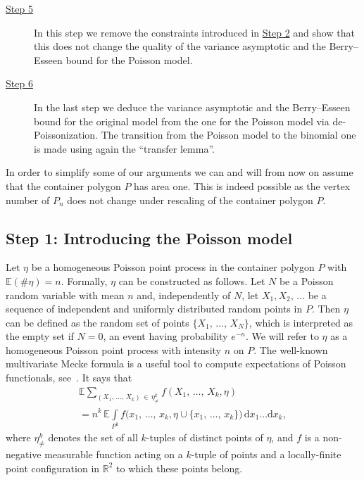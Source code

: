 \documentclass[AHL,Unicode,longabstracts,published]{cedram}
\newcommand{\bbR}{\mathbb{R}}
\newcommand{\bbE}{\mathbb{E}}
\begin{document}
\begin{description}
\item[{\hyperref[step5]{Step 5}}] In this step we remove the constraints introduced in \hyperref[step2]{Step 2} and show that this does not change the quality of the variance asymptotic and the Berry--Esseen bound for the Poisson model.

\item[{\hyperref[sec:dePoisson]{Step 6}}] In the last step we deduce the variance asymptotic and the Berry--Esseen bound for the original model from the one for the Poisson model via de-Poissonization. The transition from the Poisson model to the binomial one is made using again the ``transfer lemma''.
\end{description}

In order to simplify some of our arguments we can and will from now on assume that the container polygon $P$ has area one. This is indeed possible as the vertex number of $P_n$ does not change under rescaling of the container polygon $P$.


\subsection{Step 1: Introducing the Poisson model} \label{subsec1}

Let $\eta$ be a homogeneous Poisson point process in the container polygon $P$ with $\bbE(\#\eta) = n$. Formally, $\eta$ can be constructed as follows. Let $N$ be a Poisson random variable with mean $n$ and, independently of $N$, let $X_1,X_2,\,\ldots$ be a sequence of independent and uniformly distributed random points in $P$. Then $\eta$ can be defined as the random set of points $\{X_1,\,\ldots,\,X_N\}$, which is interpreted as the empty set if $N=0$, an event having probability $e^{-n}$. We will refer to $\eta$ as a homogeneous Poisson point process with intensity $n$ on $P$. The well-known multivariate Mecke formula is a useful tool to compute expectations of Poisson functionals, see~\cite[Theorem~4.1]{LP}. It says that
\begin{multline}\label{eq:Mecke}
\bbE \sum_{(X_1,\,\ldots,\,X_k)\,\in\,\eta^k_{\neq}} f(X_1,\,\ldots,\,X_k,\eta) \\
= n^k \, \bbE \int\limits_{P^k} f\big(x_1,\,\ldots,\,x_k,\eta\cup\{x_1,\,\ldots,\,x_k\}\big)\,\mathrm{d} x_1\ldots \mathrm{d} x_k,
\end{multline}
where $\eta^k_{\neq}$ denotes the set of all $k$-tuples of distinct points of $\eta$, and $f$ is a non-negative measurable function acting on a $k$-tuple of points and a locally-finite point configuration in $\bbR^2$ to which these points belong.
\end{document}

